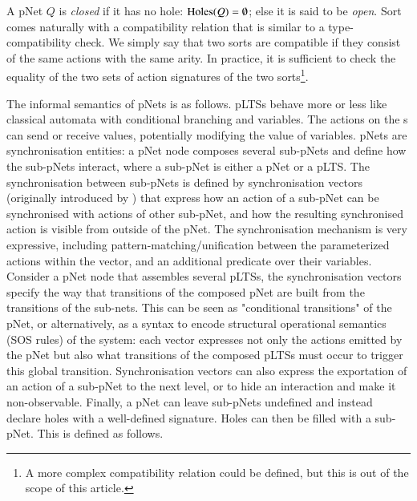 \documentclass{elsarticle}
\newcommand{\TODO}[1]{\textcolor{red}{\textbf{[TODO:#1]}}}
\begin{document}
\begin{definition}
A pNet $Q$ is \emph{closed} if it has no hole: $\operatorname{Holes}(Q)=\emptyset$; else it
is said to be \emph{open}.
Sort comes naturally with a compatibility relation that is similar to a type-compatibility check. We simply say that two sorts are compatible if they consist of the same actions with the same arity. In practice, it is sufficient to check the equality of the two sets of action signatures of the two sorts\footnote{A more complex compatibility relation could be defined, but this is out of the scope of this article.}.
\end{definition}
  
The informal semantics of pNets is as follows. pLTSs behave more or less like  classical automata with conditional branching and variables. The actions on the \pLTS s can send or receive values, potentially modifying the value of variables. 
pNets are synchronisation entities: a pNet node composes several sub-pNets and  define how the sub-pNets interact, where a sub-pNet is either a pNet or a pLTS. The synchronisation between sub-pNets is defined by synchronisation vectors (originally introduced by \cite{Arnold1982}) that express how an action of a sub-pNet can be synchronised with actions of other sub-pNet, and how the resulting synchronised action is visible from outside of the pNet. The synchronisation mechanism is very expressive, including pattern-matching/unification between the parameterized actions within the vector, and an additional predicate over their variables.
Consider a pNet node that assembles several pLTSs, the synchronisation vectors specify the way that transitions of the composed pNet are built from the transitions of the sub-nets. This can be seen as "conditional transitions" of the pNet, or alternatively, as a syntax to encode structural operational semantics (SOS rules) of the system: each vector expresses not only the actions emitted by the pNet but also what transitions of the composed pLTSs must occur to trigger this global transition.
Synchronisation vectors can also express the exportation of an action of a sub-pNet to the next level, or to hide an interaction and make it non-observable. Finally, a pNet can leave sub-pNets undefined and instead declare holes with a well-defined signature. Holes can then be filled with a sub-pNet. This is defined as follows.
\end{document}
